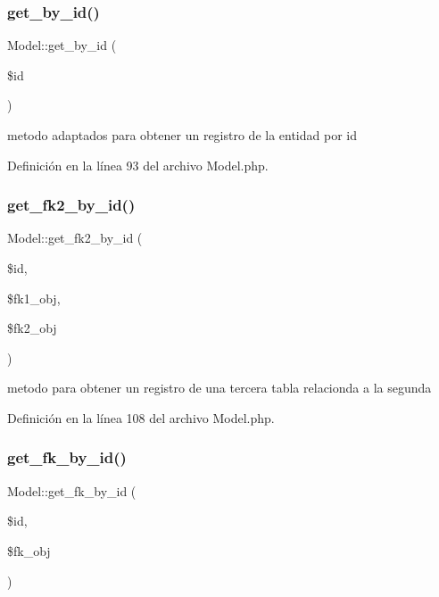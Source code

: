 \mbox{\label{class_model_a708a0fc588b55e650ea0847da98f7b80}} 
\subsubsection{\texorpdfstring{get\_by\_id()}{get\_by\_id()}}
{\footnotesize\ttfamily Model\+::get\+\_\+by\+\_\+id (\begin{DoxyParamCaption}\item[{}]{\$id }\end{DoxyParamCaption})}

metodo adaptados para obtener un registro de la entidad por id 

Definición en la línea 93 del archivo Model.\+php.

\mbox{\label{class_model_af5ccad2ad89087e4454e71787163a6ba}} 
\subsubsection{\texorpdfstring{get\_fk2\_by\_id()}{get\_fk2\_by\_id()}}
{\footnotesize\ttfamily Model\+::get\+\_\+fk2\+\_\+by\+\_\+id (\begin{DoxyParamCaption}\item[{}]{\$id,  }\item[{}]{\$fk1\+\_\+obj,  }\item[{}]{\$fk2\+\_\+obj }\end{DoxyParamCaption})}

metodo para obtener un registro de una tercera tabla relacionda a la segunda 

Definición en la línea 108 del archivo Model.\+php.

\mbox{\label{class_model_aca3b0fcfd538c6f2d0f1a05dfcea87ae}} 
\subsubsection{\texorpdfstring{get\_fk\_by\_id()}{get\_fk\_by\_id()}}
{\footnotesize\ttfamily Model\+::get\+\_\+fk\+\_\+by\+\_\+id (\begin{DoxyParamCaption}\item[{}]{\$id,  }\item[{}]{\$fk\+\_\+obj }\end{DoxyParamCaption})}


